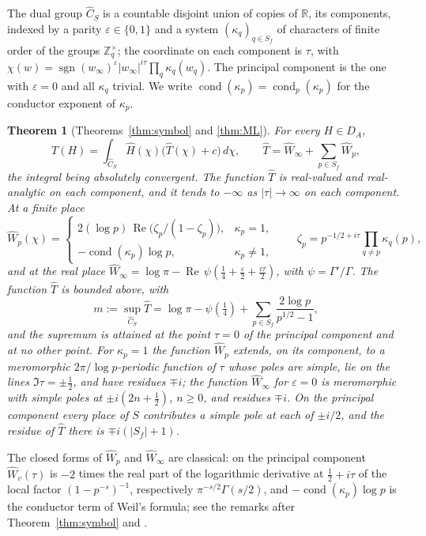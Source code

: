\documentclass[11pt]{amsart}
\newtheorem{theorem}{Theorem}[section]
\theoremstyle{definition}
\theoremstyle{remark}
\newcommand{\R}{\mathbb R}
\newcommand{\Z}{\mathbb Z}
\newcommand{\Rel}{\operatorname{Re}}
\newcommand{\sgn}{\operatorname{sgn}}
\newcommand{\cond}{\operatorname{cond}}
\begin{document}
The dual group $\widehat C_S$ is a countable disjoint union of copies of
$\R$, its components, indexed by a parity $\varepsilon\in\{0,1\}$ and a system
$(\kappa_q)_{q\in S_f}$ of characters of finite order of the groups
$\Z_q^{\times}$; the coordinate on each component is $\tau$, with
$\chi(w)=\sgn(w_{\infty})^{\varepsilon}|w_{\infty}|^{i\tau}\prod_q\kappa_q(w_q)$.
The principal component is the one with $\varepsilon=0$ and all $\kappa_q$
trivial.  We write $\cond(\kappa_p)=\cond_p(\kappa_p)$ for the conductor exponent of
$\kappa_p$.

\begin{theorem}[Theorems~\ref{thm:symbol} and \ref{thm:ML}]\label{thm:introB}
For every $H\in D_A$,
\[
T(H)=\int_{\widehat C_S}\widehat H(\chi)\bigl(\widehat T(\chi)+c\bigr)\,d\chi,
\qquad
\widehat T=\widehat W_{\infty}+\sum_{p\in S_f}\widehat W_p ,
\]
the integral being absolutely convergent.  The function $\widehat T$ is
real-valued and real-analytic on each component, and it tends to $-\infty$ as
$|\tau|\to\infty$ on each component.  At a finite place
\[
\widehat W_p(\chi)=
\begin{cases}
2(\log p)\,\Rel\bigl(\zeta_p/(1-\zeta_p)\bigr), & \kappa_p=1,\\[2pt]
-\cond(\kappa_p)\log p, & \kappa_p\neq1,
\end{cases}
\qquad \zeta_p=p^{-1/2+i\tau}\prod_{q\ne p}\kappa_q(p),
\]
and at the real place
$\widehat W_{\infty}=\log\pi-\Rel\,\psi(\tfrac14+\tfrac{\varepsilon}{2}
+\tfrac{i\tau}2)$, with $\psi=\Gamma'/\Gamma$.  The function $\widehat T$ is
bounded above, with
\[
m:=\sup_{\widehat C_S}\widehat T
=\log\pi-\psi(\tfrac14)+\sum_{p\in S_f}\frac{2\log p}{p^{1/2}-1},
\]
and the supremum is attained at the point $\tau=0$ of the principal component
and at no other point.  For $\kappa_p=1$ the function $\widehat W_p$ extends,
on its component, to a meromorphic $2\pi/\log p$-periodic function of $\tau$
whose poles are simple, lie on the lines $\Im\tau=\pm\tfrac12$, and have
residues $\mp i$; the function $\widehat W_{\infty}$ for $\varepsilon=0$ is
meromorphic with simple poles at $\pm i(2n+\tfrac12)$, $n\ge0$, and residues
$\mp i$.  On the principal component every place of $S$ contributes a simple
pole at each of $\pm i/2$, and the residue of $\widehat T$ there is
$\mp i(|S_f|+1)$.
\end{theorem}

The closed forms of $\widehat W_p$ and $\widehat W_{\infty}$ are classical: on
the principal component $\widehat W_v(\tau)$ is $-2$ times the real part of
the logarithmic derivative at $\tfrac12+i\tau$ of the local factor
$(1-p^{-s})^{-1}$, respectively $\pi^{-s/2}\Gamma(s/2)$, and
$-\cond(\kappa_p)\log p$ is the conductor term of Weil's formula; see the
remarks after Theorem~\ref{thm:symbol} and \cite{BurnolConductor,BurnolCR}.
\end{document}
